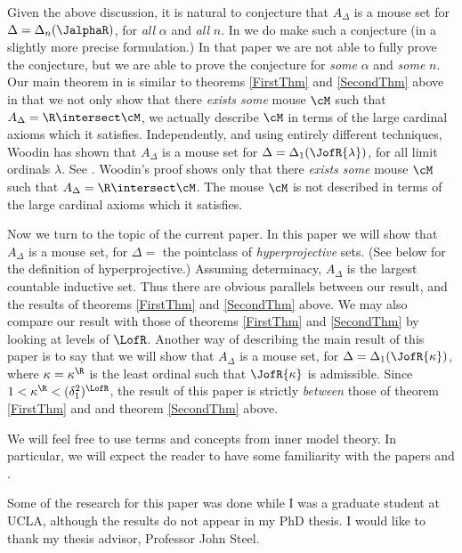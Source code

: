 Given the above discussion,
it is natural to conjecture that $A_{\Delta}$ is a mouse set for
$\Delta=\Delta_n(\JalphaR)$, for \emph{all} $\alpha$ and \emph{all}
$n$. In \cite{Mouse_Sets} we do make such a conjecture (in a slightly
more precise formulation.) In that paper we are not able to fully
prove the conjecture, but we are able to prove the conjecture for
\emph{some} $\alpha$ and \emph{some} $n$.
Our main theorem in \cite{Mouse_Sets} is
similar to theorems \ref{FirstThm} and \ref{SecondThm} above in that
we not only show that there \emph{exists some} mouse $\cM$ such that
$A_{\Delta}=\R\intersect\cM$, we actually describe $\cM$ in terms of
the large cardinal axioms which it satisfies.  Independently,
and using entirely different techniques, Woodin
has shown that $A_{\Delta}$ is
a mouse set for $\Delta=\Delta_1(\JofR{\lambda})$, for all limit
ordinals $\lambda$. See \cite{Woodins_Mouse_Sets}.
Woodin's proof shows only that there
\emph{exists some} mouse $\cM$ such that
$A_{\Delta}=\R\intersect\cM$. The mouse $\cM$ is not described in terms
of the large cardinal axioms which it satisfies.

Now we turn to the topic of the current paper. In this paper we will show
that $A_{\Delta}$ is a mouse set, for $\Delta =$ the pointclass of
\emph{hyperprojective} sets. (See below for the definition of
hyperprojective.)
 Assuming determinacy, $A_{\Delta}$ is
the largest countable inductive set. Thus there are obvious parallels
between our result, and the results of theorems \ref{FirstThm} and
\ref{SecondThm} above. We may also compare our result with those of
theorems \ref{FirstThm} and \ref{SecondThm} by looking at  levels
of $\LofR$. Another way of describing the main result of this paper
is to say that we will show that $A_{\Delta}$ is a mouse set, for
$\Delta=\Delta_1(\JofR{\kappa})$, where $\kappa=\kappa^{\R}$ is the
least ordinal such that $\JofR{\kappa}$ is admissible. Since
$1<\kappa^{\R}<(\delta^2_1)^{\LofR}$, the result of this paper is
strictly \emph{between} those of theorem \ref{FirstThm} and
and theorem \ref{SecondThm} above.

We will feel free to use terms and concepts from inner model theory.
In particular, we will expect the reader to have some familiarity
with the papers \cite{FSIT} and \cite{Many_Woodins}.

Some of the research for this paper was done while I was a
graduate student at UCLA, although the results do not appear in my
 PhD thesis. I would like to thank my thesis advisor,
Professor John Steel.

